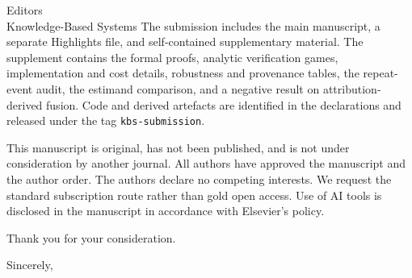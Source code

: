 \documentclass[11pt]{letter}
\begin{document}
\begin{letter}{Editors\\Knowledge-Based Systems}
The submission includes the main manuscript, a separate Highlights file, and
self-contained supplementary material. The supplement contains the formal
proofs, analytic verification games, implementation and cost details,
robustness and provenance tables, the repeat-event audit, the estimand
comparison, and a negative result on attribution-derived fusion. Code and
derived artefacts are identified in the declarations and released under the
tag \texttt{kbs-submission}.

This manuscript is original, has not been published, and is not under
consideration by another journal. All authors have approved the manuscript and
the author order. The authors declare no competing interests. We request the
standard subscription route rather than gold open access. Use of AI tools is
disclosed in the manuscript in accordance with Elsevier's policy.

Thank you for your consideration.

\closing{Sincerely,}
\end{letter}
\end{document}
